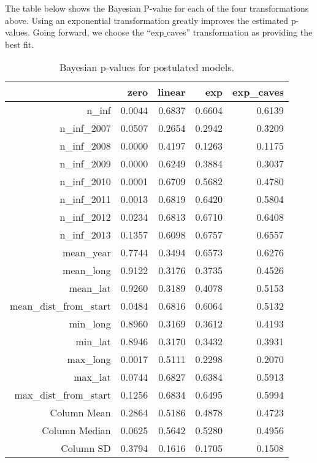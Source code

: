 \documentclass[11pt]{article}
\begin{document}
The table below shows the Bayesian P-value for each of the four
transformations above.  Using an exponential transformation greatly
improves the estimated p-values.  Going forward, we choose the
``exp\(\_\)caves'' transformation as providing the best fit.
\begin{table}[ht]
\centering
\begin{tabular}{rrrrr}
  & zero & linear & exp & exp\_caves \\ 
  \hline
n\_inf & 0.0044 & 0.6837 & 0.6604 & 0.6139 \\ 
  n\_inf\_2007 & 0.0507 & 0.2654 & 0.2942 & 0.3209 \\ 
  n\_inf\_2008 & 0.0000 & 0.4197 & 0.1263 & 0.1175 \\ 
  n\_inf\_2009 & 0.0000 & 0.6249 & 0.3884 & 0.3037 \\ 
  n\_inf\_2010 & 0.0001 & 0.6709 & 0.5682 & 0.4780 \\ 
  n\_inf\_2011 & 0.0013 & 0.6819 & 0.6420 & 0.5804 \\ 
  n\_inf\_2012 & 0.0234 & 0.6813 & 0.6710 & 0.6408 \\ 
  n\_inf\_2013 & 0.1357 & 0.6098 & 0.6757 & 0.6557 \\ 
  mean\_year & 0.7744 & 0.3494 & 0.6573 & 0.6276 \\ 
  mean\_long & 0.9122 & 0.3176 & 0.3735 & 0.4526 \\ 
  mean\_lat & 0.9260 & 0.3189 & 0.4078 & 0.5153 \\ 
  mean\_dist\_from\_start & 0.0484 & 0.6816 & 0.6064 & 0.5132 \\ 
  min\_long & 0.8960 & 0.3169 & 0.3612 & 0.4193 \\ 
  min\_lat & 0.8946 & 0.3170 & 0.3432 & 0.3931 \\ 
  max\_long & 0.0017 & 0.5111 & 0.2298 & 0.2070 \\ 
  max\_lat & 0.0744 & 0.6827 & 0.6384 & 0.5913 \\ 
  max\_dist\_from\_start & 0.1256 & 0.6834 & 0.6495 & 0.5994 \\ 
   \hline
Column Mean & 0.2864 & 0.5186 & 0.4878 & 0.4723 \\ 
  Column Median & 0.0625 & 0.5642 & 0.5280 & 0.4956 \\ 
  Column SD & 0.3794 & 0.1616 & 0.1705 & 0.1508 \\ 
   \hline
\end{tabular}
\caption{Bayesian p-values for postulated models.} 
\end{table}
\end{document}
